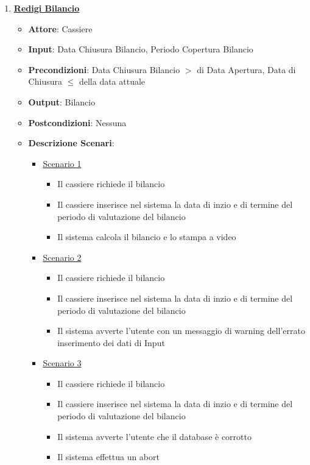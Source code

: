 \begin{enumerate}
    \item \uline {{\bf Redigi Bilancio}}
    \begin{itemize}
        \item {\bf Attore}: Cassiere
        \item {\bf Input}: Data Chiusura Bilancio, Periodo Copertura Bilancio
        \item {\bf Precondizioni}: Data Chiusura Bilancio $>$ di Data Apertura, Data di Chiusura $\leq$
            della data attuale
        \item {\bf Output}: Bilancio
        \item {\bf Postcondizioni}: Nessuna
        \item {\bf Descrizione Scenari}:
        \begin{itemize}
            \item \uline{Scenario 1}
            \begin{itemize}
                \item Il cassiere richiede il bilancio
                \item Il cassiere inserisce nel sistema la data di inzio e di termine del
                    periodo di valutazione del bilancio
                \item Il sistema calcola il bilancio e lo stampa a video
            \end{itemize}
            \item \uline{Scenario 2}
            \begin{itemize}
                \item Il cassiere richiede il bilancio
                \item Il cassiere inserisce nel sistema la data di inzio e di termine del
                    periodo di valutazione del bilancio
                \item Il sistema avverte l'utente con un messaggio di warning dell'errato
                    inserimento dei dati di Input
            \end{itemize}
            \item \uline{Scenario 3}
            \begin{itemize}
                \item Il cassiere richiede il bilancio
                \item Il cassiere inserisce nel sistema la data di inzio e di termine del
                    periodo di valutazione del bilancio
                \item Il sistema avverte l'utente che il database \`e corrotto
                \item Il sistema effettua un abort
            \end{itemize}
        \end{itemize}
    \end{itemize}


\end{enumerate}
